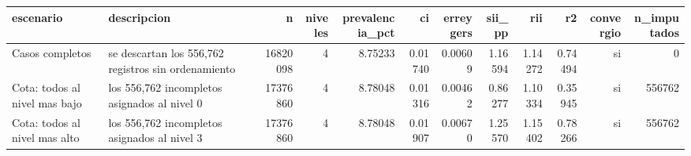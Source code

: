 \begin{tabular}{llrrrrrrrrrr}
\toprule
escenario & descripcion & n & niveles & prevalencia\_pct & ci & erreygers & sii\_pp & rii & r2 & convergio & n\_imputados \\
\midrule
Casos completos & se descartan los 556,762 registros sin ordenamiento & 16820098 & 4 & 8.75233 & 0.01740 & 0.00609 & 1.16594 & 1.14272 & 0.74494 & si & 0 \\
Cota: todos al nivel mas bajo & los 556,762 incompletos asignados al nivel 0 & 17376860 & 4 & 8.78048 & 0.01316 & 0.00462 & 0.86277 & 1.10334 & 0.35945 & si & 556762 \\
Cota: todos al nivel mas alto & los 556,762 incompletos asignados al nivel 3 & 17376860 & 4 & 8.78048 & 0.01907 & 0.00670 & 1.25570 & 1.15402 & 0.78266 & si & 556762 \\
\bottomrule
\end{tabular}
